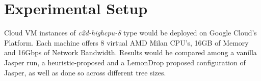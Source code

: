 \documentclass{article}
\begin{document}
\section{Experimental Setup}
Cloud VM instances of \textit{c2d-highcpu-8} type would be deployed on Google Cloud's Platform. 
Each machine offers 8 virtual AMD Milan CPU's, 16GB of Memory and 16Gbps of Network Bandwidth. 
Results would be compared among a vanilla Jasper run, a heuristic-proposed 
and a LemonDrop proposed configuration of Jasper, as well as done so across different tree sizes.


    
\end{document}
